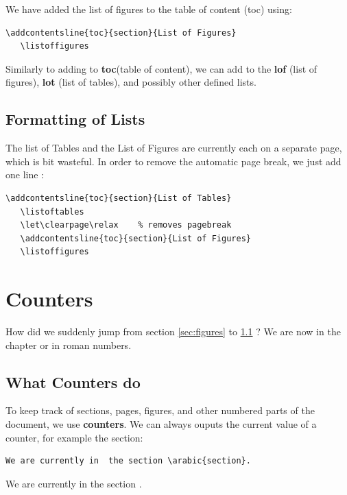 \documentclass[a4paper,10pt]{report} %
\begin{document}
 We have added the list of figures to the table of content (toc) using: 
 \begin{lstlisting}[language={[latex]tex}, frame=single,basicstyle=\footnotesize]
   \addcontentsline{toc}{section}{List of Figures} 
   \listoffigures
\end{lstlisting}

Similarly to adding to \textbf{toc}(table of content), we can add to the 
\textbf{lof} (list of figures), \textbf{lot} (list of tables), and possibly other defined lists.   

\subsection{Formatting of Lists}

The list of Tables and the List of Figures are currently each on a separate page, which is bit wasteful. In order to remove the automatic page break, we just add one line : 
\begin{lstlisting}[language={[latex]tex}, frame=single,basicstyle=\footnotesize]
   \addcontentsline{toc}{section}{List of Tables}
   \listoftables  
   \let\clearpage\relax    % removes pagebreak                       
   \addcontentsline{toc}{section}{List of Figures}  
   \listoffigures
\end{lstlisting}

 \setcounter{section}{1}
 \section{Counters}%
How did we suddenly jump from section \ref{sec:figures} to \ref{sec:counters}  ? We are now in the chapter  or  in roman numbers.\\

\subsection{What Counters do}\label{sec:counters}
To keep track of sections, pages, figures, and other numbered parts of the document, we use \textbf{counters}. We can always ouputs the current value of a counter, for example the section:
\begin{lstlisting}[language={[latex]tex}, frame=single,basicstyle=\footnotesize]
  We are currently in  the section \arabic{section}.
\end{lstlisting}

We are currently in  the section .\\
\end{document}
